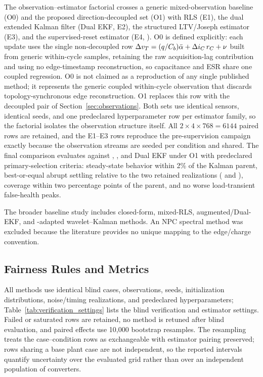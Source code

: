 The observation--estimator factorial crosses a generic mixed-observation baseline (O0) and the proposed direction-decoupled set (O1) with RLS (E1), the dual extended Kalman filter (Dual EKF, E2), the structured LTV/Joseph estimator (E3), and the supervised-reset estimator (E4, \TSSRKE{}). O0 is defined explicitly: each update uses the single non-decoupled row $\Delta v_T=(q/C_b)\bar{\alpha}+\Delta i_C\,r_C+\nu$ built from generic within-cycle samples, retaining the raw acquisition-lag contribution and using no edge-timestamp reconstruction, so capacitance and ESR share one coupled regression. O0 is not claimed as a reproduction of any single published method; it represents the generic coupled within-cycle observation that discards topology-synchronous edge reconstruction. O1 replaces this row with the decoupled pair of Section~\ref{sec:observations}. Both sets use identical sensors, identical seeds, and one predeclared hyperparameter row per estimator family, so the factorial isolates the observation structure itself. All $2\times4\times768=6144$ paired rows are retained, and the E1--E3 rows reproduce the pre-supervision campaign exactly because the observation streams are seeded per condition and shared. The final comparison evaluates \TSSRKE{} against \TSRLS{}, \TSKF{}, and Dual EKF under O1 with predeclared primary-selection criteria: steady-state behavior within 2\% of the Kalman parent, best-or-equal abrupt settling relative to the two retained realizations (\TSRLS{} and \TSKF{}), coverage within two percentage points of the parent, and no worse load-transient false-health peaks.

The broader baseline study includes closed-form, mixed-RLS, augmented/Dual-EKF, and \Cuk{}-adapted wavelet--Kalman methods. An NPC spectral method was excluded because the literature provides no unique mapping to the \Cuk{} edge/charge convention.

\subsection{Fairness Rules and Metrics}

All methods use identical blind cases, observations, seeds, initialization distributions, noise/timing realizations, and predeclared hyperparameters; Table~\ref{tab:verification_settings} lists the blind verification and estimator settings. Failed or saturated rows are retained, no method is retuned after blind evaluation, and paired effects use 10,000 bootstrap resamples. The resampling treats the case--condition rows as exchangeable with estimator pairing preserved; rows sharing a base plant case are not independent, so the reported intervals quantify uncertainty over the evaluated grid rather than over an independent population of converters.

